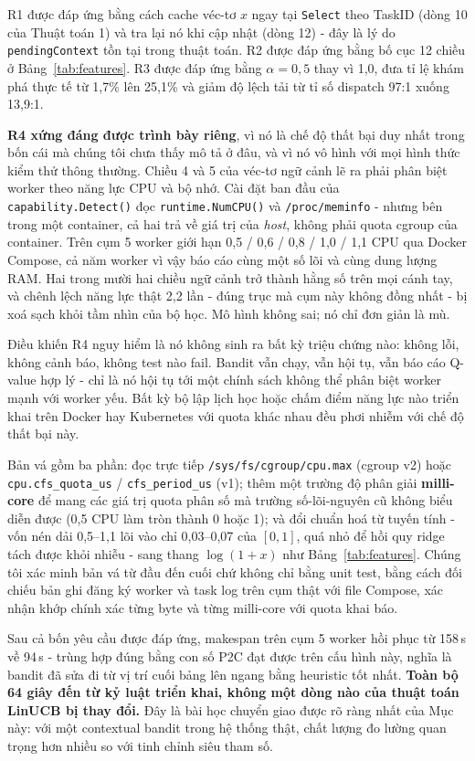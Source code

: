 \documentclass[final,5p,times,twocolumn]{elsarticle}
\begin{document}
R1 được đáp ứng bằng cách cache véc-tơ $x$ ngay tại \texttt{Select} theo TaskID (dòng 10 của Thuật toán 1) và tra lại nó khi cập nhật (dòng 12) - đây là lý do \texttt{pendingContext} tồn tại trong thuật toán. R2 được đáp ứng bằng bố cục 12 chiều ở Bảng~\ref{tab:features}. R3 được đáp ứng bằng $\alpha=0{,}5$ thay vì 1,0, đưa tỉ lệ khám phá thực tế từ 1,7\% lên 25,1\% và giảm độ lệch tải từ tỉ số dispatch 97:1 xuống 13,9:1.

\textbf{R4 xứng đáng được trình bày riêng}, vì nó là chế độ thất bại duy nhất trong bốn cái mà chúng tôi chưa thấy mô tả ở đâu, và vì nó vô hình với mọi hình thức kiểm thử thông thường. Chiều 4 và 5 của véc-tơ ngữ cảnh lẽ ra phải phân biệt worker theo năng lực CPU và bộ nhớ. Cài đặt ban đầu của \texttt{capability.Detect()} đọc \texttt{runtime.NumCPU()} và \texttt{/proc/meminfo} - nhưng bên trong một container, cả hai trả về giá trị của \emph{host}, không phải quota cgroup của container. Trên cụm 5 worker giới hạn 0,5 / 0,6 / 0,8 / 1,0 / 1,1 CPU qua Docker Compose, cả năm worker vì vậy báo cáo cùng một số lõi và cùng dung lượng RAM. Hai trong mười hai chiều ngữ cảnh trở thành hằng số trên mọi cánh tay, và chênh lệch năng lực thật 2,2 lần - đúng trục mà cụm này không đồng nhất - bị xoá sạch khỏi tầm nhìn của bộ học. Mô hình không sai; nó chỉ đơn giản là mù.

Điều khiến R4 nguy hiểm là nó không sinh ra bất kỳ triệu chứng nào: không lỗi, không cảnh báo, không test nào fail. Bandit vẫn chạy, vẫn hội tụ, vẫn báo cáo Q-value hợp lý - chỉ là nó hội tụ tới một chính sách không thể phân biệt worker mạnh với worker yếu. Bất kỳ bộ lập lịch học hoặc chấm điểm năng lực nào triển khai trên Docker hay Kubernetes với quota khác nhau đều phơi nhiễm với chế độ thất bại này.

Bản vá gồm ba phần: đọc trực tiếp \texttt{/sys/fs/cgroup/cpu.max} (cgroup v2) hoặc \texttt{cpu.cfs\_quota\_us} / \texttt{cfs\_period\_us} (v1); thêm một trường độ phân giải \textbf{milli-core} để mang các giá trị quota phân số mà trường số-lõi-nguyên cũ không biểu diễn được (0,5 CPU làm tròn thành 0 hoặc 1); và đổi chuẩn hoá từ tuyến tính - vốn nén dải 0,5--1,1 lõi vào chỉ 0,03--0,07 của $[0,1]$, quá nhỏ để hồi quy ridge tách được khỏi nhiễu - sang thang $\log(1+x)$ như Bảng~\ref{tab:features}. Chúng tôi xác minh bản vá từ đầu đến cuối chứ không chỉ bằng unit test, bằng cách đối chiếu bản ghi đăng ký worker và task log trên cụm thật với file Compose, xác nhận khớp chính xác từng byte và từng milli-core với quota khai báo.

Sau cả bốn yêu cầu được đáp ứng, makespan trên cụm 5 worker hồi phục từ 158\,s về 94\,s - trùng hợp đúng bằng con số P2C đạt được trên cấu hình này, nghĩa là bandit đã sửa đi từ vị trí cuối bảng lên ngang bằng heuristic tốt nhất. \textbf{Toàn bộ 64 giây đến từ kỷ luật triển khai, không một dòng nào của thuật toán LinUCB bị thay đổi.} Đây là bài học chuyển giao được rõ ràng nhất của Mục này: với một contextual bandit trong hệ thống thật, chất lượng đo lường quan trọng hơn nhiều so với tinh chỉnh siêu tham số.
\end{document}
